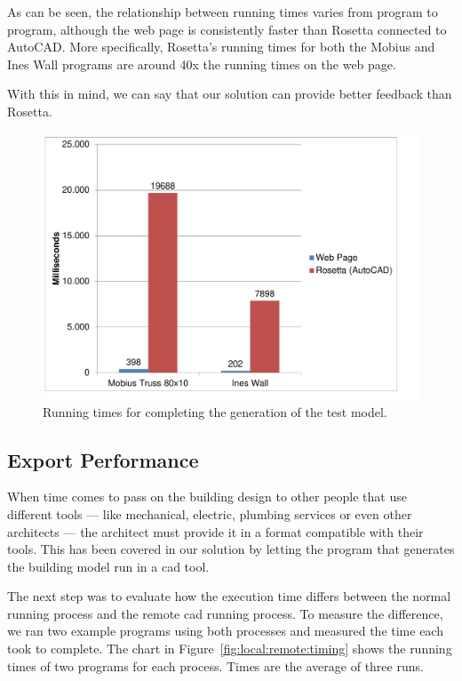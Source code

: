 As can be seen, the relationship between running times varies from program to program, although the web page is consistently faster than Rosetta connected to AutoCAD.
More specifically, Rosetta's running times for both the Mobius and Ines Wall programs are around 40x the running times on the web page.

With this in mind, we can say that our solution can provide better feedback than Rosetta.


\begin{figure}
  \centering
  \includegraphics[width=12cm]{./images/run_timing_chart}
  \caption{Running times for completing the generation of the test model.}
  \label{fig:run:timing:chart}
\end{figure}


\subsection{Export Performance}
When time comes to pass on the building design to other people that use different tools --- like mechanical, electric, plumbing services or even other architects --- the architect must provide it in a format compatible with their tools.
This has been covered in our solution by letting the program that generates the building model run in a \gls{cad} tool.

The next step was to evaluate how the execution time differs between the normal running process and the remote \gls{cad} running process.
To measure the difference, we ran two example programs using both processes and measured the time each took to complete.
The chart in Figure~\ref{fig:local:remote:timing} shows the running times of two programs for each process.
Times are the average of three runs.

